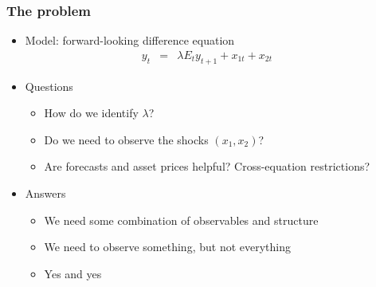 \documentclass{beamer}
\begin{document}
\begin{frame}
\frametitle{The problem}
\begin{itemize} \bigskipamount
\item Model:  forward-looking difference equation
\begin{eqnarray*}
    y_t &=& \lambda E_t y_{t+1} + x_{1t} + x_{2t} \phantom{xxx}
\end{eqnarray*}
\item Questions \\
\begin{itemize}
\item How do we identify $\lambda$?
\item Do we need to observe the shocks $(x_1,x_2)$?
\item Are forecasts and asset prices helpful? Cross-equation restrictions?
\end{itemize}
\item Answers \\
\begin{itemize}
\item We need some combination of observables and structure
\item We need to observe something, but not everything
\item Yes and yes %
\end{itemize}
\end{itemize}
\end{frame}
\end{document}
